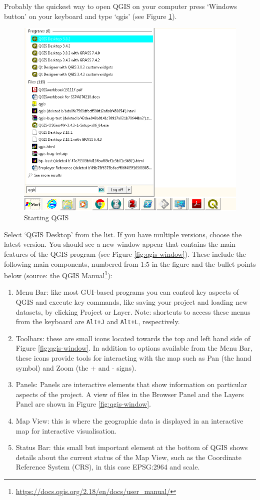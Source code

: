 \documentclass[10pt,a5paper,]{book}
\providecommand{\tightlist}{%
  \setlength{\itemsep}{0pt}\setlength{\parskip}{0pt}}
\renewcommand{\href}[2]{#2\footnote{\url{#1}}}
\begin{document}
Probably the quickest way to open QGIS on your computer press `Windows button' on your keyboard and type `qgis' (see Figure \ref{fig:qgis-start}).

\begin{figure}
\includegraphics[width=0.5\linewidth]{figures/qgis-start} \caption{Starting QGIS}\label{fig:qgis-start}
\end{figure}

Select `QGIS Desktop' from the list.
If you have multiple versions, choose the latest version.
You should see a new window appear that contains the main features of the QGIS program (see Figure \ref{fig:qgis-window}).
These include the following main components, numbered from 1:5 in the figure and the bullet points below (source: the \href{https://docs.qgis.org/2.18/en/docs/user_manual/}{QGIS Manual}):

\begin{enumerate}
\def\labelenumi{\arabic{enumi}.}
\tightlist
\item
  Menu Bar: like most GUI-based programs you can control key aspects of QGIS and execute key commands, like saving your project and loading new datasets, by clicking Project or Layer. Note: shortcuts to access these menus from the keyboard are \texttt{Alt+J} and \texttt{Alt+L}, respectively.
\item
  Toolbars: these are small icons located towards the top and left hand side of Figure \ref{fig:qgis-window}. In addition to options available from the Menu Bar, these icons provide tools for interacting with the map such as Pan (the hand symbol) and Zoom (the + and - signs).
\item
  Panels: Panels are interactive elements that show information on particular aspects of the project. A view of files in the Browser Panel and the Layers Panel are shown in Figure \ref{fig:qgis-window}.
\item
  Map View: this is where the geographic data is displayed in an interactive map for interactive visualisation.
\item
  Status Bar: this small but important element at the bottom of QGIS shows details about the current status of the Map View, such as the Coordinate Reference System (CRS), in this case EPSG:2964 and scale.
\end{enumerate}
\end{document}
